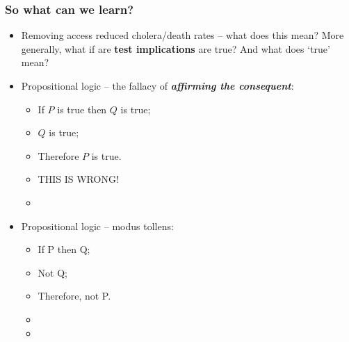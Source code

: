 \documentclass[aspectratio=169]{beamer}
\theoremstyle{principle}
\begin{document}
\begin{frame}
\frametitle{So what can we learn?}
\begin{itemize}
\item Removing access reduced cholera/death rates -- what does this mean?  More generally, what if are \textbf{test implications} are true?  And what does `true' mean?
\bigskip
\item Propositional logic -- the fallacy of \textit{\textbf{affirming the consequent}}:
\begin{itemize}
\item If $P$ is true then $Q$ is true;
\item $Q$ is true;
\item Therefore $P$ is true.
\item[] \color{white}THIS IS WRONG!
\item[]
\end{itemize}
\bigskip
\item[]  \color{white}Propositional logic -- modus tollens:
\begin{itemize}
\item[] \color{white}If P then Q;
\item[] \color{white}Not Q;
\item[] \color{white}Therefore, not P.
\item[]
\item[]
 \end{itemize}
\end{itemize}

\end{frame}
\end{document}
